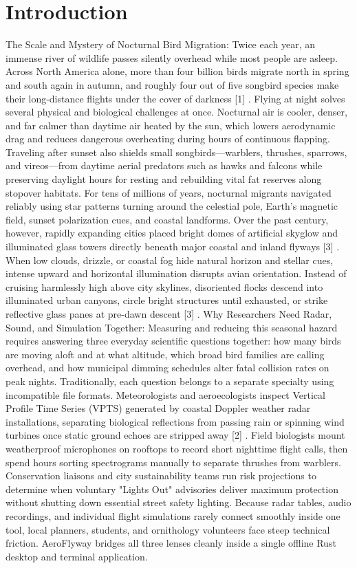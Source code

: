 \documentclass[10pt,letterpaper]{article}
\begin{document}
\section{Introduction}
The Scale and Mystery of Nocturnal Bird Migration: Twice each year, an immense river of wildlife passes silently overhead while most people are asleep. Across North America alone, more than four billion birds migrate north in spring and south again in autumn, and roughly four out of five songbird species make their long-distance flights under the cover of darkness [1] . Flying at night solves several physical and biological challenges at once. Nocturnal air is cooler, denser, and far calmer than daytime air heated by the sun, which lowers aerodynamic drag and reduces dangerous overheating during hours of continuous flapping. Traveling after sunset also shields small songbirds---warblers, thrushes, sparrows, and vireos---from daytime aerial predators such as hawks and falcons while preserving daylight hours for resting and rebuilding vital fat reserves along stopover habitats. For tens of millions of years, nocturnal migrants navigated reliably using star patterns turning around the celestial pole, Earth's magnetic field, sunset polarization cues, and coastal landforms. Over the past century, however, rapidly expanding cities placed bright domes of artificial skyglow and illuminated glass towers directly beneath major coastal and inland flyways [3] . When low clouds, drizzle, or coastal fog hide natural horizon and stellar cues, intense upward and horizontal illumination disrupts avian orientation. Instead of cruising harmlessly high above city skylines, disoriented flocks descend into illuminated urban canyons, circle bright structures until exhausted, or strike reflective glass panes at pre-dawn descent [3] . Why Researchers Need Radar, Sound, and Simulation Together: Measuring and reducing this seasonal hazard requires answering three everyday scientific questions together: how many birds are moving aloft and at what altitude, which broad bird families are calling overhead, and how municipal dimming schedules alter fatal collision rates on peak nights. Traditionally, each question belongs to a separate specialty using incompatible file formats. Meteorologists and aeroecologists inspect Vertical Profile Time Series (VPTS) generated by coastal Doppler weather radar installations, separating biological reflections from passing rain or spinning wind turbines once static ground echoes are stripped away [2] . Field biologists mount weatherproof microphones on rooftops to record short nighttime flight calls, then spend hours sorting spectrograms manually to separate thrushes from warblers. Conservation liaisons and city sustainability teams run risk projections to determine when voluntary "Lights Out" advisories deliver maximum protection without shutting down essential street safety lighting. Because radar tables, audio recordings, and individual flight simulations rarely connect smoothly inside one tool, local planners, students, and ornithology volunteers face steep technical friction. AeroFlyway bridges all three lenses cleanly inside a single offline Rust desktop and terminal application.
\end{document}
